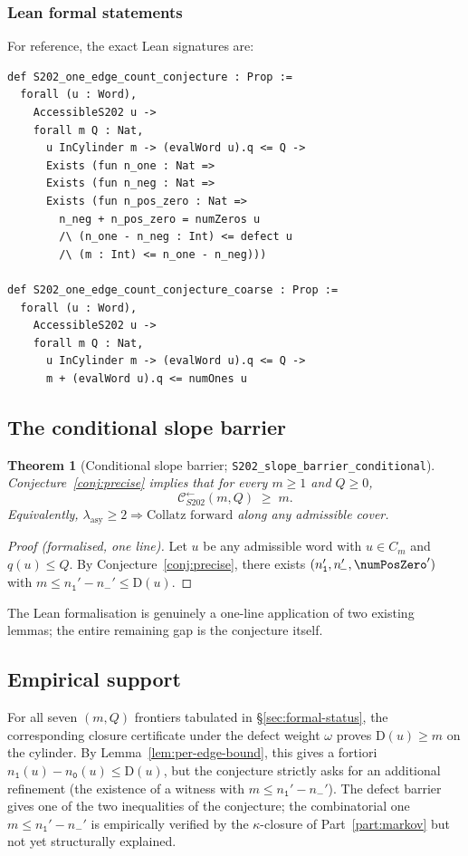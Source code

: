 \documentclass[11pt,a4paper]{article}
\theoremstyle{plain}
\newtheorem{theorem}{Theorem}[section]
\theoremstyle{definition}
\newcommand{\defect}{\mathrm{D}}
\newcommand{\Cback}{\mathcal{C}^{\!\leftarrow}_{S202}}
\newcommand{\numOnes}{n_{\mathtt{1}}}
\newcommand{\numNeg}{n_{\!-}}
\newcommand{\numZeros}{n_{\mathtt{0}}}
\begin{document}
\subsubsection*{Lean formal statements}

For reference, the exact Lean signatures are:
\begin{lstlisting}
def S202_one_edge_count_conjecture : Prop :=
  forall (u : Word),
    AccessibleS202 u ->
    forall m Q : Nat,
      u InCylinder m -> (evalWord u).q <= Q ->
      Exists (fun n_one : Nat =>
      Exists (fun n_neg : Nat =>
      Exists (fun n_pos_zero : Nat =>
        n_neg + n_pos_zero = numZeros u
        /\ (n_one - n_neg : Int) <= defect u
        /\ (m : Int) <= n_one - n_neg)))

def S202_one_edge_count_conjecture_coarse : Prop :=
  forall (u : Word),
    AccessibleS202 u ->
    forall m Q : Nat,
      u InCylinder m -> (evalWord u).q <= Q ->
      m + (evalWord u).q <= numOnes u
\end{lstlisting}

\subsection{The conditional slope barrier}

\begin{theorem}[Conditional slope barrier;
\texttt{S202\_slope\_barrier\_conditional}]
\label{thm:slope-conditional}
Conjecture~\ref{conj:precise} implies that for every $m \ge 1$ and
$Q \ge 0$,
\[
  \Cback(m, Q) \;\ge\; m.
\]
Equivalently,
$\lambda_{\mathrm{asy}} \ge 2 \Rightarrow \text{Collatz forward}$ along
any admissible cover.
\end{theorem}

\begin{proof}[Proof (formalised, one line)]
Let $u$ be any admissible word with $u \in C_m$ and $q(u) \le Q$.
By Conjecture~\ref{conj:precise}, there exists
$(\numOnes', \numNeg', \numPosZero')$ with
$m \le \numOnes' - \numNeg' \le \defect(u)$.
\end{proof}

The Lean formalisation is genuinely a one-line application of two
existing lemmas; the entire remaining gap is the conjecture itself.

\subsection{Empirical support}

For all seven $(m, Q)$ frontiers tabulated in
\S\ref{sec:formal-status}, the corresponding closure certificate
under the defect weight $\omega$ proves
$\defect(u) \ge m$ on the cylinder. By
Lemma~\ref{lem:per-edge-bound}, this gives a fortiori
$\numOnes(u) - \numZeros(u) \le \defect(u)$, but the conjecture
strictly asks for an additional refinement (the existence of a
witness with $m \le \numOnes' - \numNeg'$). The defect barrier
gives one of the two inequalities of the conjecture; the
combinatorial one $m \le \numOnes' - \numNeg'$ is empirically
verified by the $\kappa$-closure of Part~\ref{part:markov} but not
yet structurally explained.
\end{document}
